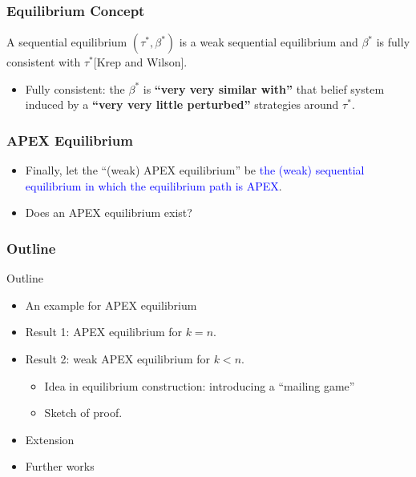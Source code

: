 \documentclass[9pt]{beamer}
\begin{document}
\begin{frame}
  \frametitle{Equilibrium Concept}


\begin{definition}
A sequential equilibrium $(\tau^{*},\beta^{*})$  is a weak  sequential equilibrium and $\beta^{*}$ is fully consistent with $\tau^{*}$[Krep and Wilson].
\end{definition}
\begin{itemize}
\item Fully consistent: 
the $\beta^{*}$ is \textbf{``very very similar with''} that belief system induced by a \textbf{``very very little perturbed''} strategies around $\tau^{*}$.
\end{itemize}
\end{frame}

\begin{frame}
  \frametitle{APEX Equilibrium}

\begin{itemize}
\item Finally, let the ``(weak) APEX equilibrium'' be \textcolor{blue}{the (weak) sequential equilibrium in which the equilibrium path is APEX}.
\item Does an APEX equilibrium exist?
\end{itemize}

\end{frame}

\begin{frame}


  \frametitle{Outline}
Outline

\begin{itemize}
\item An example for APEX equilibrium
\item Result 1: APEX equilibrium for $k=n$.
\item Result 2: weak APEX equilibrium for $k<n$.
\begin{itemize}
\item Idea in equilibrium construction: introducing a ``mailing game''
\item Sketch of proof.
\end{itemize}
\item Extension
\item Further works
\end{itemize}


\end{frame}
\end{document}
